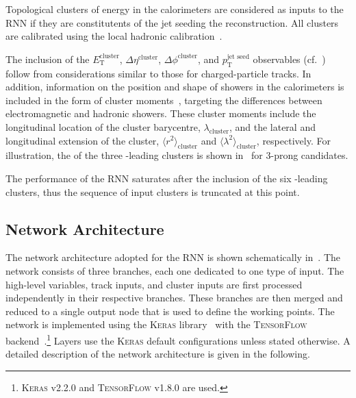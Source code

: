 Topological clusters of energy in the calorimeters are considered as
inputs to the RNN \tauid if they are constitutents of the jet seeding
the \tauhadvis reconstruction. All clusters are calibrated using the
local hadronic calibration~\cite{PERF-2014-07}.

The inclusion of the $E_{\text{T}}^{\text{cluster}}$,
$\Delta \eta^{\text{cluster}}$, $\Delta \phi^{\text{cluster}}$, and
$p_{\text{T}}^{\text{jet seed}}$ observables
(cf.~) follow from considerations
similar to those for charged-particle tracks. In addition, information
on the position and shape of showers in the calorimeters is included
in the form of cluster moments~\cite{PERF-2014-07}, targeting the
differences between electromagnetic and hadronic showers. These
cluster moments include the longitudinal location of the cluster
barycentre, $\lambda_{\text{cluster}}$, and the lateral and
longitudinal extension of the cluster,
$\langle r^2 \rangle_{\text{cluster}}$ and
$\langle \lambda^2 \rangle_{\text{cluster}}$, respectively. For
illustration, the \ET of the three \ET-leading clusters is shown
in~
for 3-prong \tauhadvis candidates.

The performance of the RNN \tauid saturates after the inclusion of the
six \ET-leading clusters, thus the sequence of input clusters is
truncated at this point.


\subsection{Network Architecture}

The network architecture adopted for the RNN \tauid is shown
schematically in~. The network
consists of three branches, each one dedicated to one type of
input. The high-level variables, track inputs, and cluster inputs are
first processed independently in their respective branches. These
branches are then merged and reduced to a single output node that is
used to define the \tauid working points. The network is implemented
using the \textsc{Keras} library~\cite{keras} with the
\textsc{TensorFlow}
backend~\cite{tensorflow2015-whitepaper}.\footnote{\textsc{Keras}
  v2.2.0 and \textsc{TensorFlow} v1.8.0 are used.} Layers use the
\textsc{Keras} default configurations unless stated otherwise. A
detailed description of the network architecture is given in the
following.

